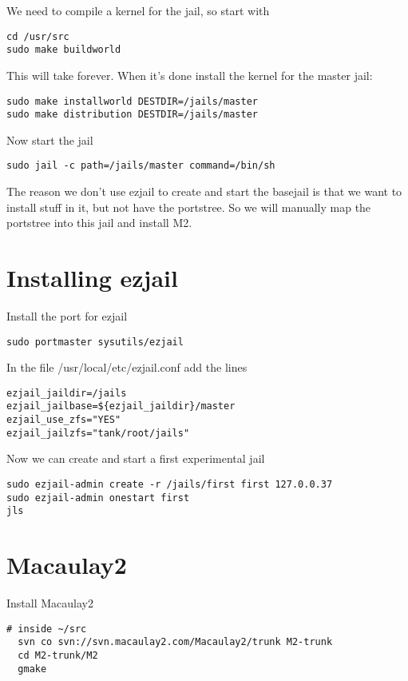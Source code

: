 \documentclass[a4paper]{article}
\begin{document}
We need to compile a kernel for the jail, so start with

\begin{verbatim}
cd /usr/src
sudo make buildworld
\end{verbatim}

This will take forever.
When it's done install the kernel for the master jail:

\begin{verbatim}
sudo make installworld DESTDIR=/jails/master
sudo make distribution DESTDIR=/jails/master
\end{verbatim}

Now start the jail

\begin{verbatim}
sudo jail -c path=/jails/master command=/bin/sh
\end{verbatim}

The reason we don't use ezjail to create and start the basejail is that we want to install stuff in it, but not have the portstree. 
So we will manually map the portstree into this jail and install M2.

\section{Installing ezjail}
Install the port for ezjail

\begin{verbatim}
sudo portmaster sysutils/ezjail
\end{verbatim}

In the file /usr/local/etc/ezjail.conf add the lines

\begin{verbatim}
ezjail_jaildir=/jails
ezjail_jailbase=${ezjail_jaildir}/master
ezjail_use_zfs="YES"
ezjail_jailzfs="tank/root/jails"
\end{verbatim}

Now we can create and start a first experimental jail

\begin{verbatim}
sudo ezjail-admin create -r /jails/first first 127.0.0.37
sudo ezjail-admin onestart first
jls
\end{verbatim}


\section{Macaulay2}
Install Macaulay2

\begin{verbatim}
# inside ~/src
  svn co svn://svn.macaulay2.com/Macaulay2/trunk M2-trunk
  cd M2-trunk/M2
  gmake

\end{verbatim}
\end{document}
